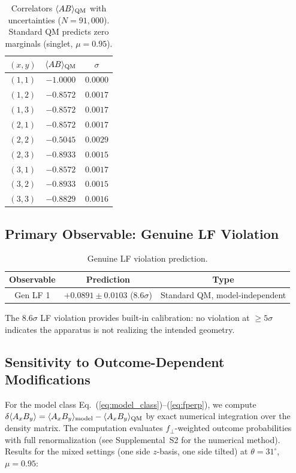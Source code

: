 \documentclass[twocolumn,aps,pra,superscriptaddress,floatfix,10pt]{revtex4-2}
\begin{document}
\begin{table}[ht]
\centering
\caption{Correlators $\langle AB\rangle_{\rm QM}$ with uncertainties
($N = 91{,}000$). Standard QM predicts zero marginals (singlet,
$\mu = 0.95$).}
\label{tab:correlators}
\begin{tabular}{ccc}
\toprule
$(x,y)$ & $\langle AB\rangle_{\rm QM}$ & $\sigma$ \\
\midrule
$(1,1)$ & $-1.0000$ & $0.0000$ \\
$(1,2)$ & $-0.8572$ & $0.0017$ \\
$(1,3)$ & $-0.8572$ & $0.0017$ \\
$(2,1)$ & $-0.8572$ & $0.0017$ \\
$(2,2)$ & $-0.5045$ & $0.0029$ \\
$(2,3)$ & $-0.8933$ & $0.0015$ \\
$(3,1)$ & $-0.8572$ & $0.0017$ \\
$(3,2)$ & $-0.8933$ & $0.0015$ \\
$(3,3)$ & $-0.8829$ & $0.0016$ \\
\bottomrule
\end{tabular}
\end{table}

\subsection{Primary Observable: Genuine LF Violation}

\begin{table}[ht]
\centering
\caption{Genuine LF violation prediction.}
\label{tab:gen_lf}
\begin{tabular}{ccc}
\toprule
Observable & Prediction & Type \\
\midrule
Gen LF 1 & $+0.0891 \pm 0.0103$ ($8.6\sigma$) & Standard QM, model-independent \\
\bottomrule
\end{tabular}
\end{table}

The $8.6\sigma$ LF violation provides built-in calibration: no
violation at $\ge 5\sigma$ indicates the apparatus is not realizing the
intended geometry.

\subsection{Sensitivity to Outcome-Dependent Modifications}
\label{sec:sensitivity}

For the model class Eq.~(\ref{eq:model_class})--(\ref{eq:fperp}), we
compute $\delta\langle A_x B_y\rangle = \langle A_x B_y\rangle_{\rm model}
- \langle A_x B_y\rangle_{\rm QM}$ by exact numerical integration over
the density matrix. The computation evaluates $f_\perp$-weighted
outcome probabilities with full renormalization (see Supplemental~S2
for the numerical method). Results for the mixed settings (one side
$z$-basis, one side tilted) at $\theta = 31^\circ$, $\mu = 0.95$:
\end{document}

